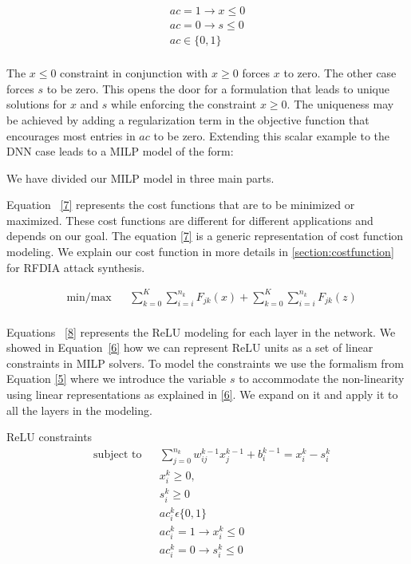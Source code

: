 \begin{equation}
\label{6}
\begin{aligned}
ac =  1 \rightarrow x \leq 0  \\
ac =  0 \rightarrow s \leq 0  \\
ac \in \{0,1\} \\
\end{aligned}
\end{equation}

The $x \leq 0$ constraint in conjunction with $x \geq 0$ forces $x$ to zero. The other case forces $s$ to be zero.
This opens the door for a formulation that leads to unique solutions for $x$ and $s$ while enforcing the constraint $x \geq 0$.
The uniqueness may be achieved by adding a regularization term in the objective function that encourages most entries in $ac$ to be zero.
Extending this scalar example to the DNN case leads to a \ac{MILP} model of the form:


We have divided our \ac{MILP} model in three main parts. 





Equation ~\ref{7} represents the cost functions that are to be minimized or maximized.
These cost functions are different for different applications and depends on our goal. 
The equation \ref{7} is a generic representation of cost function modeling. 
We explain our cost function in more details in \ref{section:costfunction} for \ac{RFDIA} attack synthesis. 

\begin{equation}
\label{7}
\begin{aligned}
& \underset{}{\text{min/max}}
& &  \sum_{k=0}^{K} \sum_{i=i}^{n_k}F_{jk}(x)   + \sum_{k=0}^{K} \sum_{i=i}^{n_k}F_{jk}(z)  \\
\end{aligned}
\end{equation}


Equations ~\ref{8} represents the ReLU modeling for each layer in the network. 
We showed in Equation~\ref{6} how we can represent ReLU units as a set of linear constraints in \ac{MILP} solvers. 
To model the constraints we use the formalism from Equation \ref{5} where we introduce the variable $s$ to accommodate the non-linearity using linear representations as explained in \ref{6}. 
We expand on it and apply it to all the layers in the modeling. 
 
ReLU constraints
\begin{equation}
\label{8}
\begin{aligned}
& \text{subject to} & &  \sum_{j=0}^{n_k} w_{ij}^{k-1}x_{j}^{k-1} + b_i^{k-1} = x_i^k - s_i^k  \\
& & & x_i^k \geq 0, \\
& & & s_i^k \geq 0 \\
& & & ac_i^k  \epsilon  \{0,1\} \\
& & & ac_i^k  =  1 \rightarrow  x_i^k \leq 0  \\
& & & ac_i^k =  0 \rightarrow s_i^k  \leq 0   \\
\end{aligned}
\end{equation}

